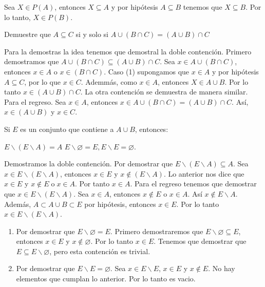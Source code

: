 \documentclass[fc]{tarea}
\newcommand{\menos}{\backslash}
\begin{document}
\begin{solution}
    Sea $X \in P(A)$, entonces $X \subseteq A$ y por hipótesis $A \subseteq B$ tenemos que $X \subseteq B$. Por lo tanto,
    $X \in P(B)$.
\end{solution}

\begin{exercise}
  Demuestre que $A \subseteq C$ si y solo si $A \cup (B \cap C) = (A \cup B) \cap C$  
\end{exercise}

\begin{solution}
    Para la demostras la idea tenemos que demostral la doble contención. Primero demostramos que $A \cup (B \cap C) \subseteq (A \cup B) \cap C$.
    Sea $x \in A \cup (B \cap C)$, entonces $x \in A$ o $x \in (B \cap C)$. Caso (1) supongamos que $x \in A$ y por hipótesis
    $A \subseteq C$, por lo que $x \in C$. Ademmás, como $x \in A$, entonces $X \in A \cup B$. Por lo tanto $ x \in (A \cup B)
    \cap C$. La otra contención se demuestra de manera similar.
    Para el regreso. Sea $x \in A$, entonces $x \in A \cup (B \cap C) = (A \cup B) \cap C$. Así, $x \in (A \cup B)$
    y $x \in C$.
\end{solution}

\begin{exercise}
    Si $E$ es un conjunto que contiene a $A \cup B$, entonces:
    \begin{tasks}
    \task $E \menos (E \menos A) = A$
    \task $E \menos \varnothing = E, E \menos E= \varnothing$.
    \end{tasks}
\end{exercise}

\begin{solution}
    \begin{tasks}
        \task Demostramos la doble contención. Por demostrar que $E \menos (E \menos A) \subseteq A$. Sea 
        $x \in E \menos (E \menos A)$, entonces $x \in E$ y $x \notin (E \menos A)$. Lo anterior nos dice que
        $x \in E$ y $x \notin E\; \text{o}\; x \in A$. Por tanto $x \in A$.
        Para el regreso tenemos que demostrar que $x \in E \menos (E \menos A)$. Sea $x \in A$, entonces $x \notin E$
        o $x \in A$. Así $x \notin E\menos A$. Además, $A \subset A \cup B \subset E$ por hipótesis, entonces $x \in E$.
        Por lo tanto $x \in E \menos (E\menos A)$.
        \task
        \begin{enumerate}
            \item Por demostrar que $E \menos \varnothing = E$. Primero demostraremos que $E \menos \varnothing \subseteq E$,
            entonces $x \in E$ y $x \notin \varnothing$. Por lo tanto $x \in E$. Tenemos que demostrar que $E \subseteq E\menos \varnothing$,
            pero esta contención es trivial.
            \item Por demostrar que $ E \menos E= \varnothing$. Sea $x \in E\menos E$, $x \in E$ y $x \notin E$. No hay elementos
            que cumplan lo anterior. Por lo tanto es vacio.
        \end{enumerate}
    \end{tasks}
    
\end{solution}
\end{document}
